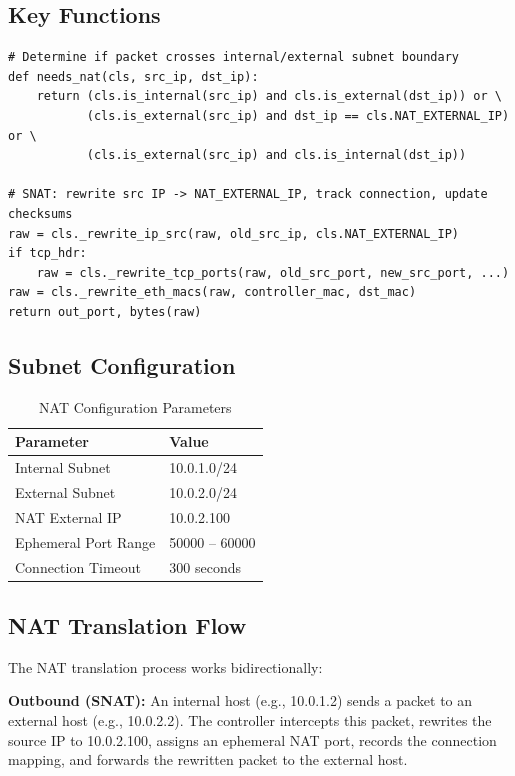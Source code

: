 \documentclass[12pt,a4paper]{article}
\begin{document}
\subsection{Key Functions}

\begin{lstlisting}[caption={NAT: Subnet Check and Core Rewrite}]
# Determine if packet crosses internal/external subnet boundary
def needs_nat(cls, src_ip, dst_ip):
    return (cls.is_internal(src_ip) and cls.is_external(dst_ip)) or \
           (cls.is_external(src_ip) and dst_ip == cls.NAT_EXTERNAL_IP) or \
           (cls.is_external(src_ip) and cls.is_internal(dst_ip))

# SNAT: rewrite src IP -> NAT_EXTERNAL_IP, track connection, update checksums
raw = cls._rewrite_ip_src(raw, old_src_ip, cls.NAT_EXTERNAL_IP)
if tcp_hdr:
    raw = cls._rewrite_tcp_ports(raw, old_src_port, new_src_port, ...)
raw = cls._rewrite_eth_macs(raw, controller_mac, dst_mac)
return out_port, bytes(raw)
\end{lstlisting}

\subsection{Subnet Configuration}

\begin{table}[H]
\centering
\begin{tabular}{@{}ll@{}}
\toprule
\textbf{Parameter} & \textbf{Value} \\
\midrule
Internal Subnet & 10.0.1.0/24 \\
External Subnet & 10.0.2.0/24 \\
NAT External IP & 10.0.2.100 \\
Ephemeral Port Range & 50000 -- 60000 \\
Connection Timeout & 300 seconds \\
\bottomrule
\end{tabular}
\caption{NAT Configuration Parameters}
\end{table}

\subsection{NAT Translation Flow}

The NAT translation process works bidirectionally:

\textbf{Outbound (SNAT):} An internal host (e.g., 10.0.1.2) sends a packet to an external host (e.g., 10.0.2.2). The controller intercepts this packet, rewrites the source IP to 10.0.2.100, assigns an ephemeral NAT port, records the connection mapping, and forwards the rewritten packet to the external host.
\end{document}
